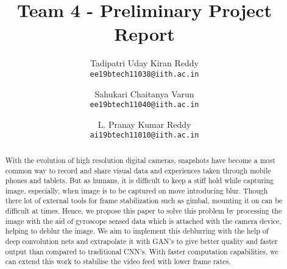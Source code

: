\documentclass[10pt,twocolumn,letterpaper]{article}
\begin{document}
\title{Team 4 - Preliminary Project Report}

\author{Tadipatri Uday Kiran Reddy\\
{\tt\small ee19btech11038@iith.ac.in}
\and
Sahukari Chaitanya Varun\\
{\tt\small ee19btech11040@iith.ac.in}
\and
L. Pranay Kumar Reddy\\
{\tt\small ai19btech11010@iith.ac.in}
}
\maketitle

\begin{abstract}
With the evolution of high resolution digital cameras, snapshots have become a most common way to record and share visual data and experiences taken through mobile phones and tablets. But as humans, it is difficult to keep a stiff hold while capturing image, especially, when image is to be captured on move introducing blur. Though there lot of external tools for frame stabilization such as gimbal, mounting it on can be difficult at times. Hence, we propose this paper to solve this problem by processing the image with the aid of gyroscope sensed data which is attached with the camera device, helping to deblur the image. We aim to implement this deblurring with the help of deep convolution nets and extrapolate it with GAN's to give better quality and faster output than compared to traditional CNN's. With faster computation capabilities, we can extend this work to stabilise the video feed with lower frame rates.
\end{abstract}

\end{document}
